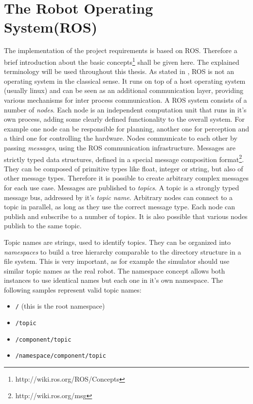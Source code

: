 \section{The Robot Operating System(ROS)}

The implementation of the project requirements is based on ROS. Therefore a brief introduction about the basic concepts\footnote{http://wiki.ros.org/ROS/Concepts} shall be given here. The explained terminology will be used throughout this thesis. As stated in \cite{quigley2009}, ROS is not an operating system in the classical sense. It runs on top of a host operating system (usually linux) and can be seen as an additional communication layer, providing various mechanisms for inter process communication. A ROS system consists of a number of \emph{nodes}. Each node is an independent computation unit that runs in it's own process, adding some clearly defined functionality to the overall system. For example one node can be responsible for planning, another one for perception and a third one for controlling the hardware. Nodes communicate to each other by passing \emph{messages}, using the ROS communication infrastructure. Messages are strictly typed data structures, defined in a special message composition format\footnote{http://wiki.ros.org/msg}. They can be composed of primitive types like float, integer or string, but also of other message types. Therefore it is possible to create arbitrary complex messages for each use case. Messages are published to \emph{topics}. A topic is a strongly typed message bus, addressed by it's \emph{topic name}. Arbitrary nodes can connect to a topic in parallel, as long as they use the correct message type. Each node can publish and subscribe to a number of topics. It is also possible that various nodes publish to the same topic. 

Topic names are strings, used to identify topics. They can be organized into \emph{namespaces} to build a tree hierarchy comparable to the directory structure in a file system. This is very important, as for example the simulator should use similar topic names as the real robot. The namespace concept allows both instances to use identical names but each one in it's own namespace. The following samples represent valid topic names:
\begin{itemize}
\item \texttt{/} (this is the root namespace)
\item \texttt{/topic}
\item \texttt{/component/topic}
\item \texttt{/namespace/component/topic}
\end{itemize}

